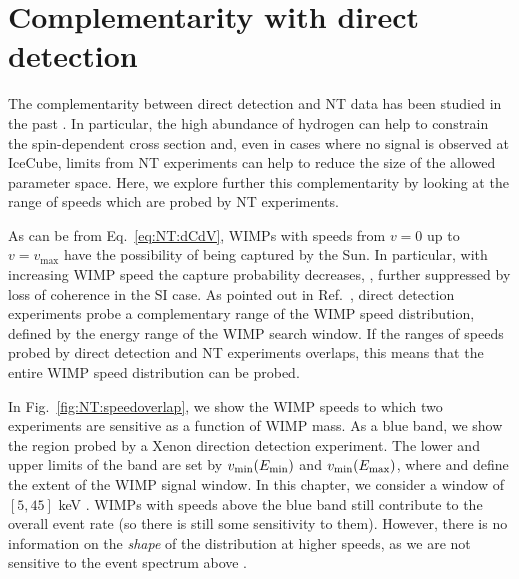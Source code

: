 



\section{Complementarity with direct detection}

The complementarity between direct detection and NT data has been studied in the past \cite{Arina:2013}. In particular, the high abundance of hydrogen can help to constrain the spin-dependent cross section and, even in cases where no signal is observed at IceCube, limits from NT experiments can help to reduce the size of the allowed parameter space. Here, we explore further this complementarity by looking at the range of speeds which are probed by NT experiments.

As can be from Eq.~\ref{eq:NT:dCdV}, WIMPs with speeds from $v=0$ up to $v=v_\textrm{max}$ have the possibility of being captured by the Sun. In particular, with increasing WIMP speed the capture probability decreases, , further suppressed by loss of coherence in the SI case. As pointed out in Ref.~\cite{Choi:2013}, direct detection experiments probe a complementary range of the WIMP speed distribution, defined by the energy range of the WIMP search window. If the ranges of speeds probed by direct detection and NT experiments overlaps, this means that the entire WIMP speed distribution can be probed.

In Fig.~\ref{fig:NT:speedoverlap}, we show the WIMP speeds to which two experiments are sensitive as a function of WIMP mass. As a blue band, we show the region probed by a Xenon direction detection experiment. The lower and upper limits of the band are set by $v_\textrm{min}(\Emin)$ and $v_\textrm{min}(\Emax)$, where \Emin and \Emax define the extent of the WIMP signal window. In this chapter, we consider a window of $[5,45]$ keV \cite{}. WIMPs with speeds above the blue band still contribute to the overall event rate (so there is still some sensitivity to them). However, there is no information on the \textit{shape} of the distribution at higher speeds, as we are not sensitive to the event spectrum above \Emax.



